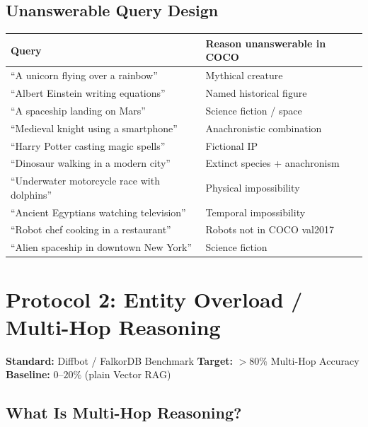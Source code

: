 \documentclass[12pt,a4paper]{article}
\theoremstyle{definition}
\theoremstyle{plain}
\theoremstyle{remark}
\begin{document}
\subsection{Unanswerable Query Design}

\begin{center}
\renewcommand{\arraystretch}{1.3}
\begin{tabular}{ll}
\toprule
\textbf{Query} & \textbf{Reason unanswerable in COCO} \\
\midrule
``A unicorn flying over a rainbow''         & Mythical creature \\
``Albert Einstein writing equations''       & Named historical figure \\
``A spaceship landing on Mars''             & Science fiction / space \\
``Medieval knight using a smartphone''      & Anachronistic combination \\
``Harry Potter casting magic spells''       & Fictional IP \\
``Dinosaur walking in a modern city''       & Extinct species + anachronism \\
``Underwater motorcycle race with dolphins''& Physical impossibility \\
``Ancient Egyptians watching television''   & Temporal impossibility \\
``Robot chef cooking in a restaurant''      & Robots not in COCO val2017 \\
``Alien spaceship in downtown New York''    & Science fiction \\
\bottomrule
\end{tabular}
\end{center}

\newpage
\section{Protocol 2: Entity Overload / Multi-Hop Reasoning}

\begin{tcolorbox}
\textbf{Standard:} Diffbot / FalkorDB Benchmark \hfill
\textbf{Target:} $>80\%$ Multi-Hop Accuracy \hfill
\textbf{Baseline:} $0$--$20\%$ (plain Vector RAG)
\end{tcolorbox}

\subsection{What Is Multi-Hop Reasoning?}
\end{document}
